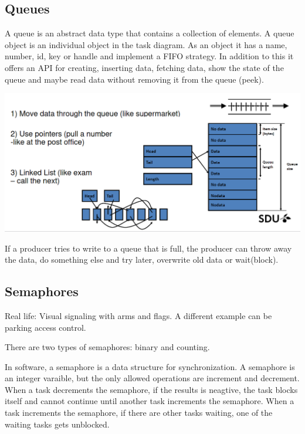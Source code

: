 \subsection{Queues}

A queue is an abstract data type that contains a collection of elements.
A queue object is an individual object in the task diagram.
As an object it has a name, number, id, key or handle and implement
a FIFO strategy. In addition to this it offers an API for
creating, inserting data, fetching data, show the state of the queue and
maybe read data without removing it from the queue (peek).


\begin{center}
	\includegraphics[width=\textwidth]{images/queue.png}
\end{center}

If a producer tries to write to a queue that is full, the producer
can throw away the data, do something else and try later,
overwrite old data or wait(block).



\subsection{Semaphores}

Real life: Visual signaling with arms and flags. A different example
can be parking access control.

There are two types of semaphores: binary and counting.

In software, a semaphore is a data structure for synchronization.
A semaphore is an integer varaible, but the only allowed operations
are increment and decrement. When a task decrements the
semaphore, if the results is neagtive,
the task blocks itself and cannot continue until
another task increments the semaphore.
When a task increments the semaphore, if there are other tasks waiting,
one of the waiting tasks gets unblocked.

